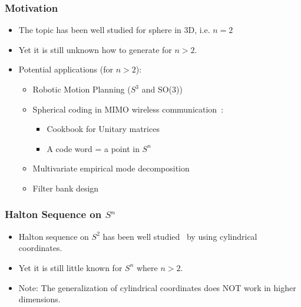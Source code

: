 \documentclass[serif]{beamer} %
\begin{document}

\begin{frame}[fragile]
\frametitle{Motivation}
\begin{itemize}
  \item The topic has been well studied for sphere in 3D, i.e. $n=2$
  \item Yet it is still unknown how to generate for $n > 2$.
  \item Potential applications (for $n > 2$):
  \begin{itemize}
    \item Robotic Motion Planning ($S^3$ and SO(3))~\cite{yershova2010generating}
    \item Spherical coding in MIMO wireless communication~\cite{utkovski2006construction}:
    \begin{itemize}
      \item Cookbook for Unitary matrices
      \item A code word = a point in $S^n$
    \end{itemize}
    \item Multivariate empirical mode decomposition~\cite{rehman2010multivariate}
    \item Filter bank design~\cite{mandic2011filter}
  \end{itemize}
\end{itemize}
\end{frame}


\begin{frame}[fragile]
\frametitle{Halton Sequence on $S^n$}
\begin{itemize}
  \item Halton sequence on $S^2$ has been well studied~\cite{cui1997equidistribution} by using cylindrical coordinates.
  \item Yet it is still little known for $S^n$ where $n>2$.
  \item
\begin{alert}{Note:}
The generalization of cylindrical coordinates does NOT work in higher dimensions.    
\end{alert}

\end{itemize}
\end{frame}
\end{document}

